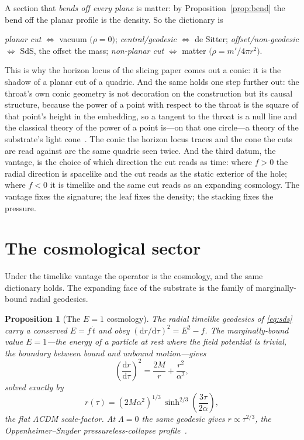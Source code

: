 \documentclass[11pt,a4paper]{article}
\newtheorem{proposition}[theorem]{Proposition}
\theoremstyle{definition}
\newcommand{\dd}{\mathrm{d}}
\begin{document}
A section that \emph{bends off every plane} is matter: by Proposition~\ref{prop:bend} the bend off the planar profile is the density. So the dictionary is

\begin{center}
\emph{planar cut} $\Leftrightarrow$ vacuum $\bigl(\rho=0\bigr)$;\qquad
\emph{central/geodesic} $\Leftrightarrow$ de Sitter;\qquad
\emph{offset/non-geodesic} $\Leftrightarrow$ SdS, the offset the mass;\qquad
\emph{non-planar cut} $\Leftrightarrow$ matter $\bigl(\rho=m'/4\pi r^{2}\bigr)$.
\end{center}

\noindent This is why the horizon locus of the slicing paper comes out a conic: it is the shadow of a planar cut of a quadric. And the same holds one step further out: the throat's own conic geometry is not decoration on the construction but its causal structure, because the power of a point with respect to the throat is the square of that point's height in the embedding, so a tangent to the throat is a null line and the classical theory of the power of a point is---on that one circle---a theory of the substrate's light cone~\cite{JanzenGeometricCore}. The conic the horizon locus traces and the cone the cuts are read against are the same quadric seen twice. And the third datum, the vantage, is the choice of which direction the cut reads as time: where $f>0$ the radial direction is spacelike and the cut reads as the static exterior of the hole; where $f<0$ it is timelike and the same cut reads as an expanding cosmology. The vantage fixes the signature; the leaf fixes the density; the stacking fixes the pressure.

\section{The cosmological sector}\label{sec:cosmology}

Under the timelike vantage the operator is the cosmology, and the same dictionary holds. The expanding face of the substrate is the family of marginally-bound radial geodesics.

\begin{proposition}[The $E=1$ cosmology]\label{prop:cosmo}
The radial timelike geodesics of \eqref{eq:sds} carry a conserved $E=f\,\dot t$ and obey $(\dd r/\dd\tau)^{2}=E^{2}-f$. The marginally-bound value $E=1$---the energy of a particle at rest where the field potential is trivial, the boundary between bound and unbound motion---gives
\begin{equation}\label{eq:E1}
\left(\frac{\dd r}{\dd\tau}\right)^{2}=\frac{2M}{r}+\frac{r^{2}}{\alpha^{2}},
\end{equation}
solved exactly by
\begin{equation}\label{eq:scalefactor}
r(\tau)=(2M\alpha^{2})^{1/3}\,\sinh^{2/3}\!\left(\frac{3\tau}{2\alpha}\right),
\end{equation}
the flat $\Lambda$CDM scale-factor. At $\Lambda=0$ the same geodesic gives $r\propto\tau^{2/3}$, the Oppenheimer--Snyder pressureless-collapse profile~\cite{Oppenheimer1939b}.
\end{proposition}
\end{document}
